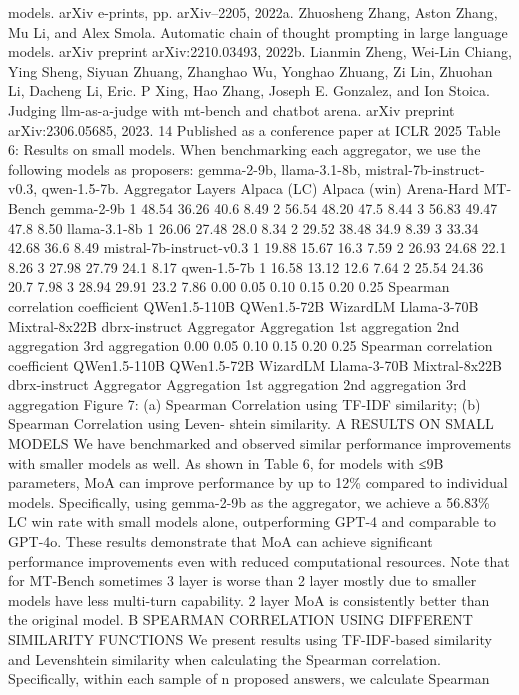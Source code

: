 models. arXiv e-prints, pp. arXiv–2205, 2022a.
Zhuosheng Zhang, Aston Zhang, Mu Li, and Alex Smola. Automatic chain of thought prompting in
large language models. arXiv preprint arXiv:2210.03493, 2022b.
Lianmin Zheng, Wei-Lin Chiang, Ying Sheng, Siyuan Zhuang, Zhanghao Wu, Yonghao Zhuang,
Zi Lin, Zhuohan Li, Dacheng Li, Eric. P Xing, Hao Zhang, Joseph E. Gonzalez, and Ion Stoica.
Judging llm-as-a-judge with mt-bench and chatbot arena. arXiv preprint arXiv:2306.05685, 2023.
14
Published as a conference paper at ICLR 2025
Table 6: Results on small models. When benchmarking each aggregator, we use the following models
as proposers: gemma-2-9b, llama-3.1-8b, mistral-7b-instruct-v0.3, qwen-1.5-7b.
Aggregator
Layers
Alpaca (LC)
Alpaca (win)
Arena-Hard
MT-Bench
gemma-2-9b
1
48.54
36.26
40.6
8.49
2
56.54
48.20
47.5
8.44
3
56.83
49.47
47.8
8.50
llama-3.1-8b
1
26.06
27.48
28.0
8.34
2
29.52
38.48
34.9
8.39
3
33.34
42.68
36.6
8.49
mistral-7b-instruct-v0.3
1
19.88
15.67
16.3
7.59
2
26.93
24.68
22.1
8.26
3
27.98
27.79
24.1
8.17
qwen-1.5-7b
1
16.58
13.12
12.6
7.64
2
25.54
24.36
20.7
7.98
3
28.94
29.91
23.2
7.86
0.00
0.05
0.10
0.15
0.20
0.25
Spearman correlation coefficient
QWen1.5-110B
QWen1.5-72B
WizardLM
Llama-3-70B
Mixtral-8x22B
dbrx-instruct
Aggregator
Aggregation
1st aggregation
2nd aggregation
3rd aggregation
0.00
0.05
0.10
0.15
0.20
0.25
Spearman correlation coefficient
QWen1.5-110B
QWen1.5-72B
WizardLM
Llama-3-70B
Mixtral-8x22B
dbrx-instruct
Aggregator
Aggregation
1st aggregation
2nd aggregation
3rd aggregation
Figure 7: (a) Spearman Correlation using TF-IDF similarity; (b) Spearman Correlation using Leven-
shtein similarity.
A
RESULTS ON SMALL MODELS
We have benchmarked and observed similar performance improvements with smaller models as well.
As shown in Table 6, for models with ≤9B parameters, MoA can improve performance by up to
12\% compared to individual models. Specifically, using gemma-2-9b as the aggregator, we achieve
a 56.83\% LC win rate with small models alone, outperforming GPT-4 and comparable to GPT-4o.
These results demonstrate that MoA can achieve significant performance improvements even with
reduced computational resources. Note that for MT-Bench sometimes 3 layer is worse than 2 layer
mostly due to smaller models have less multi-turn capability. 2 layer MoA is consistently better than
the original model.
B
SPEARMAN CORRELATION USING DIFFERENT SIMILARITY FUNCTIONS
We present results using TF-IDF-based similarity and Levenshtein similarity when calculating the
Spearman correlation. Specifically, within each sample of n proposed answers, we calculate Spearman
